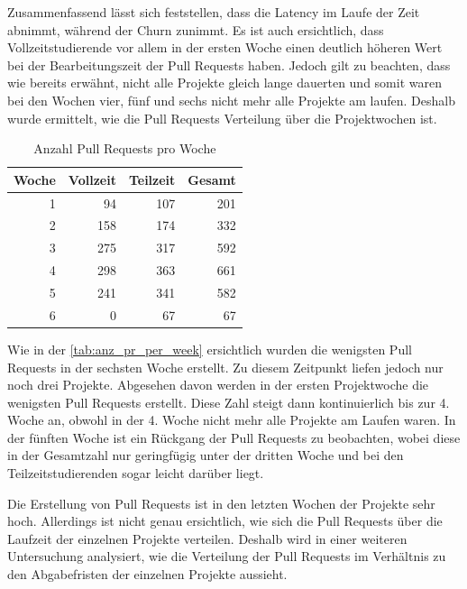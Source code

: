 Zusammenfassend lässt sich feststellen, dass die Latency im Laufe der Zeit abnimmt, während der Churn zunimmt. Es ist auch ersichtlich, dass Vollzeitstudierende vor allem in der ersten Woche einen deutlich höheren Wert bei der Bearbeitungszeit der Pull Requests haben. Jedoch gilt zu beachten, dass wie bereits erwähnt, nicht alle Projekte gleich lange dauerten und somit waren bei den Wochen vier, fünf und sechs nicht mehr alle Projekte am laufen. Deshalb wurde ermittelt, wie die Pull Requests Verteilung über die Projektwochen ist.

\begin{table}[ht]
\caption{Anzahl Pull Requests pro Woche}
\label{tab:anz_pr_per_week}
\centering
\begin{tabular}{rrrr}
\toprule
\textbf{Woche} & \textbf{Vollzeit} & \textbf{Teilzeit} & \textbf{Gesamt} \\
\midrule
1 & 94 & 107 & 201 \\
2 & 158 & 174 & 332\\
3 & 275 & 317 & 592\\
4 & 298 & 363 & 661\\
5 & 241 & 341 & 582 \\
6 & 0 & 67 & 67\\
\bottomrule
\end{tabular}
\end{table}

\newpage
Wie in der \autoref{tab:anz_pr_per_week} ersichtlich wurden die wenigsten Pull Requests in der sechsten Woche erstellt. Zu diesem Zeitpunkt liefen jedoch nur noch drei Projekte. Abgesehen davon werden in der ersten Projektwoche die wenigsten Pull Requests erstellt. Diese Zahl steigt dann kontinuierlich bis zur 4. Woche an, obwohl in der 4. Woche nicht mehr alle Projekte am Laufen waren. In der fünften Woche ist ein Rückgang der Pull Requests zu beobachten, wobei diese in der Gesamtzahl nur geringfügig unter der dritten Woche und bei den Teilzeitstudierenden sogar leicht darüber liegt. 

Die Erstellung von Pull Requests ist in den letzten Wochen der Projekte sehr hoch. Allerdings ist nicht genau ersichtlich, wie sich die Pull Requests über die Laufzeit der einzelnen Projekte verteilen. Deshalb wird in einer weiteren Untersuchung analysiert, wie die Verteilung der Pull Requests im Verhältnis zu den Abgabefristen der einzelnen Projekte aussieht.

